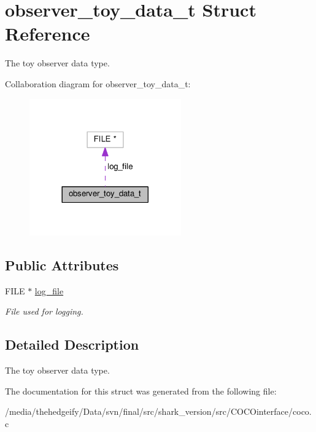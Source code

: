 \hypertarget{structobserver__toy__data__t}{}\section{observer\+\_\+toy\+\_\+data\+\_\+t Struct Reference}
\label{structobserver__toy__data__t}


The toy observer data type.  




Collaboration diagram for observer\+\_\+toy\+\_\+data\+\_\+t\+:\nopagebreak
\begin{figure}[H]
\begin{center}
\leavevmode
\includegraphics[width=185pt]{structobserver__toy__data__t__coll__graph}
\end{center}
\end{figure}
\subsection*{Public Attributes}
\begin{DoxyCompactItemize}
\item 
F\+I\+LE $\ast$ \hyperlink{structobserver__toy__data__t_a0606acac78ec676bba570f16de008627}{log\+\_\+file}\hypertarget{structobserver__toy__data__t_a0606acac78ec676bba570f16de008627}{}\label{structobserver__toy__data__t_a0606acac78ec676bba570f16de008627}

\begin{DoxyCompactList}\small\item\em File used for logging. \end{DoxyCompactList}\end{DoxyCompactItemize}


\subsection{Detailed Description}
The toy observer data type. 

The documentation for this struct was generated from the following file\+:\begin{DoxyCompactItemize}
\item 
/media/thehedgeify/\+Data/svn/final/src/shark\+\_\+version/src/\+C\+O\+C\+Ointerface/coco.\+c\end{DoxyCompactItemize}
